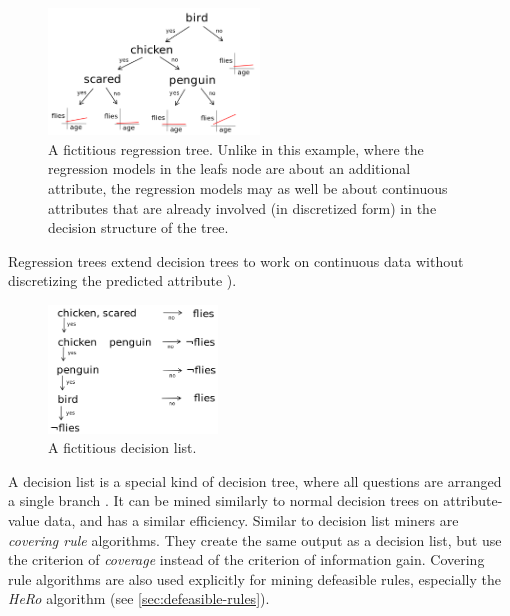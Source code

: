 
\begin{figure}[htb]
        \centering
        \includegraphics[width=0.5\textwidth]{images/regression-tree.png}
        \caption{A fictitious regression tree. Unlike in this example, where the regression models in the leafs node are about an additional attribute, the regression models may as well be about continuous attributes that are already involved (in discretized form) in the decision structure of the tree.}
        \label{fig:regression-list}
\end{figure}

Regression trees extend decision trees to work on continuous data without discretizing the predicted attribute \citep[p.~72ff.]{wittenDataMiningPractical2017}).

\label{sec:decision-lists}

\begin{figure}[htb]
        \centering
        \includegraphics[width=0.4\textwidth]{images/decision-list.png}
        \caption{A fictitious decision list.}
        \label{fig:decision-list}
\end{figure}

A decision list is a special kind of decision tree, where all questions are arranged a single branch \cite[ch.~18.5.1]{russellArtificialIntelligenceModern2010}. It can be mined similarly to normal decision trees on attribute-value data, and has a similar efficiency. Similar to decision list miners are \textit{covering rule} algorithms. They create the same output as a decision list, but use the criterion of \textit{coverage} instead of the criterion of information gain. Covering rule algorithms are also used explicitly for mining defeasible rules, especially the \textit{HeRo} algorithm (see \autoref{sec:defeasible-rules}). 

